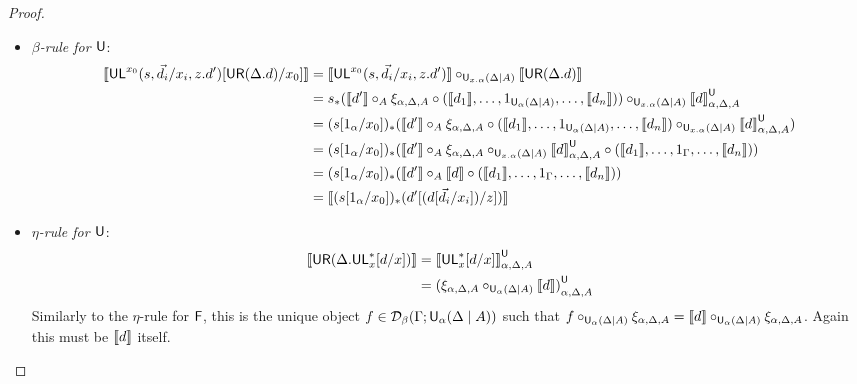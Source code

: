 \begin{proof}
\begin{itemize}
\item \emph{$\beta$-rule for $\mathsf{U}$}: 
\begin{align*}
\llbracket \mathsf{UL}^{x_0}_{}(s,\vec{d_i}/x_i,z.d')[\mathsf{UR}(\Delta.d)/x_0] \rrbracket 
&= \llbracket \mathsf{UL}^{x_0}_{}(s,\vec{d_i}/x_i,z.d') \rrbracket \circ_{\mathsf{U}_{x.\alpha}(\Delta \mid A)} \llbracket \mathsf{UR}(\Delta.d) \rrbracket\\
&= s_*(\llbracket d' \rrbracket \circ_A \xi_{\alpha, \Delta,A} \circ (\llbracket d_1 \rrbracket, \dots, 1_{\mathsf{U}_{\alpha}(\Delta \mid A)}, \dots, \llbracket d_n \rrbracket)) \circ_{\mathsf{U}_{x.\alpha}(\Delta \mid A)} {\llbracket d \rrbracket}^{\mathsf{U}}_{{\alpha},{\Delta},{A}}\\
&= (s[1_{\alpha}/x_0])_*(\llbracket d' \rrbracket \circ_A \xi_{\alpha, \Delta,A} \circ (\llbracket d_1 \rrbracket, \dots, 1_{\mathsf{U}_{\alpha}(\Delta \mid A)}, \dots, \llbracket d_n \rrbracket) \circ_{\mathsf{U}_{x.\alpha}(\Delta \mid A)} {\llbracket d \rrbracket}^{\mathsf{U}}_{{\alpha},{\Delta},{A}})\\
&= (s[1_{\alpha}/x_0])_*(\llbracket d' \rrbracket \circ_A \xi_{\alpha, \Delta,A} \circ_{\mathsf{U}_{x.\alpha}(\Delta \mid A)} {\llbracket d \rrbracket}^{\mathsf{U}}_{{\alpha},{\Delta},{A}} \circ (\llbracket d_1 \rrbracket, \dots, 1_{\Gamma}, \dots, \llbracket d_n \rrbracket) )\\
&= (s[1_{\alpha}/x_0])_*(\llbracket d' \rrbracket \circ_A \llbracket d \rrbracket \circ (\llbracket d_1 \rrbracket, \dots, 1_{\Gamma}, \dots, \llbracket d_n \rrbracket) )\\
&= \llbracket (s[1_{\alpha}/{x_0}])_*(d'[(d[{\vec{d_i}/x_i}])/z]) \rrbracket
\end{align*}

\item \emph{$\eta$-rule for $\mathsf{U}$}: 
\begin{align*}
\llbracket \mathsf{UR}(\Delta.\mathsf{UL}^*_{x}[d/x]) \rrbracket 
&= {\llbracket \mathsf{UL}^*_{x}[d/x] \rrbracket}^{\mathsf{U}}_{{\alpha},{\Delta},{A}} \\
&= {(\xi_{\alpha, \Delta, A} \circ_{\mathsf{U}_{\alpha}(\Delta \mid A)} \llbracket d \rrbracket)}^{\mathsf{U}}_{{\alpha},{\Delta},{A}}
\end{align*}
Similarly to the $\eta$-rule for $\mathsf{F}$, this is the unique object $f \in \mathcal{D}_\beta(\Gamma;\mathsf{U}_{\alpha}(\Delta \mid A))$ such that $f \circ_{\mathsf{U}_{\alpha}(\Delta \mid A)} \xi_{\alpha, \Delta, A} = \llbracket d \rrbracket \circ_{\mathsf{U}_{\alpha}(\Delta \mid A)} \xi_{\alpha, \Delta, A}$. Again this must be $\llbracket d \rrbracket$ itself.
\end{itemize}
\end{proof}

